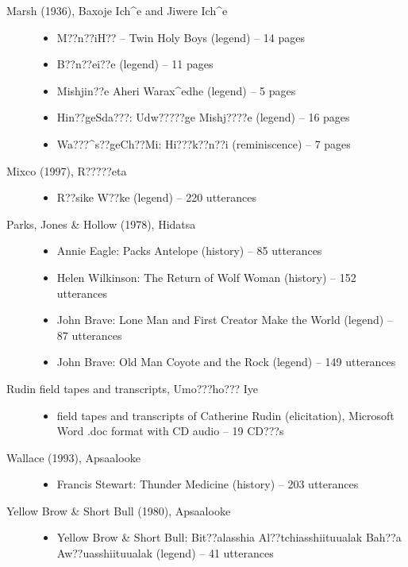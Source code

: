 \documentclass[output=paper]{LSP/langsci}
\begin{document}
\begin{description}
\item[Marsh (1936), Baxoje Ich\^{}e and Jiwere Ich\^{}e]\hfill
\begin{itemize}
\item M??n??iH?? -- Twin Holy Boys (legend) -- 14 pages
\item B??n??ei??e (legend) -- 11 pages
\item Mishjin??e Aheri Warax\^{}edhe (legend) -- 5 pages
\item Hin??geSda???: Udw?????ge Mishj????e (legend) -- 16 pages
\item Wa???\^{}s??geCh??Mi: Hi???k??n??i (reminiscence) -- 7 pages
\end{itemize}

\item[Mixco (1997), R?????eta]\hfill
\begin{itemize}
\item R??sike W??ke (legend) -- 220 utterances
\end{itemize}

\item[Parks, Jones \& Hollow (1978), Hidatsa]\hfill
\begin{itemize}
\item Annie Eagle: Packs Antelope (history) -- 85 utterances
\item Helen Wilkinson: The Return of Wolf Woman (history) -- 152 utterances
\item John Brave: Lone Man and First Creator Make the World (legend) -- 87 utterances
\item John Brave: Old Man Coyote and the Rock (legend) -- 149 utterances
\end{itemize}

\item[Rudin field tapes and transcripts, Umo???ho??? Iye]\hfill
\begin{itemize}
\item field tapes and transcripts of Catherine Rudin (elicitation), Microsoft Word .doc format with CD audio -- 19 CD???s
\end{itemize}

\item[Wallace (1993), Apsaalooke]\hfill
\begin{itemize}
\item Francis Stewart: Thunder Medicine (history) -- 203 utterances
\end{itemize}

\item[Yellow Brow \& Short Bull (1980), Apsaalooke]\hfill
\begin{itemize}
\item Yellow Brow \& Short Bull: Bit??alasshia Al??tchiasshiituualak Bah??a Aw??uasshiituualak (legend) -- 41 utterances
\end{itemize}

\end{description}
\end{document}
